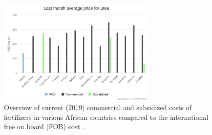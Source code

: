 \begin{figure}
    \centering
    \includegraphics[width=0.7\textwidth]{Figures/africa_costs.png}
    \caption{Overview of current (2019) commercial and subsidized costs of fertilizers in various African countries compared to the international free on board (FOB) cost \cite{africafertilizer_2018}.}
    \label{fig:africa_costs}
\end{figure}

